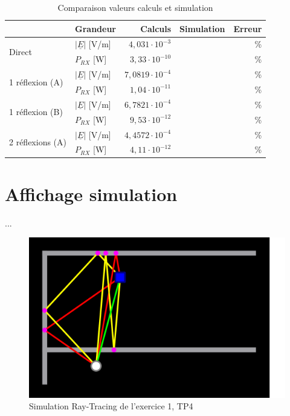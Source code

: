 \begin{table}
    \centering
    \begin{tabular}{|l|l|r|r|r|}
         \hline
                                  & Grandeur & Calculs & Simulation & Erreur \\
        \hline
\multirow{2}{*}{Direct}           & $\left|\underline{E}\right|$ [V/m] & $4,031\cdot10^{-3}$ &      & \%     \\
                                  & $P_{RX}$ [W] & $3,33\cdot10^{-10}$  &      & \%     \\
        \hline
\multirow{2}{*}{1 réflexion (A)}  & $\left|\underline{E}\right|$ [V/m] & $7,0819\cdot10^{-4}$ &      & \%     \\
                                  & $P_{RX}$ [W] & $1,04\cdot10^{−11}$ &      & \%     \\
        \hline
\multirow{2}{*}{1 réflexion (B)}  & $\left|\underline{E}\right|$ [V/m] & $6,7821\cdot10^{-4}$ &      & \%     \\
                                  & $P_{RX}$ [W] & $9,53\cdot10^{-12}$ &      & \%     \\
        \hline
\multirow{2}{*}{2 réflexions (A)} & $\left|\underline{E}\right|$ [V/m] & $4,4572\cdot10^{-4}$ &      & \%     \\
                                  & $P_{RX}$ [W] & $4,11\cdot10^{-12}$ &      & \%     \\
        \hline
    \end{tabular}
    \caption{Comparaison valeurs calculs et simulation}
    \label{tab:comparaison-calculs-simulation}
\end{table}

\section{Affichage simulation}
...

\begin{figure}[H]
    \centering
    \includegraphics[width=\textwidth]{latex/images/tp4.png}
    \caption{Simulation Ray-Tracing de l'exercice 1, TP4}
    \label{fig:simu-tp4}
\end{figure}
